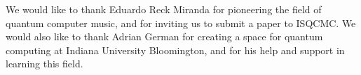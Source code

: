 \documentclass[10pt,twocolumn]{article}
\begin{document}
We would like to thank Eduardo Reck Miranda for pioneering the field of quantum computer music, and for inviting us to submit a paper to ISQCMC. We would also like to thank Adrian German for creating a space for quantum computing at Indiana University Bloomington, and for his help and support in learning this field.









\end{document}
